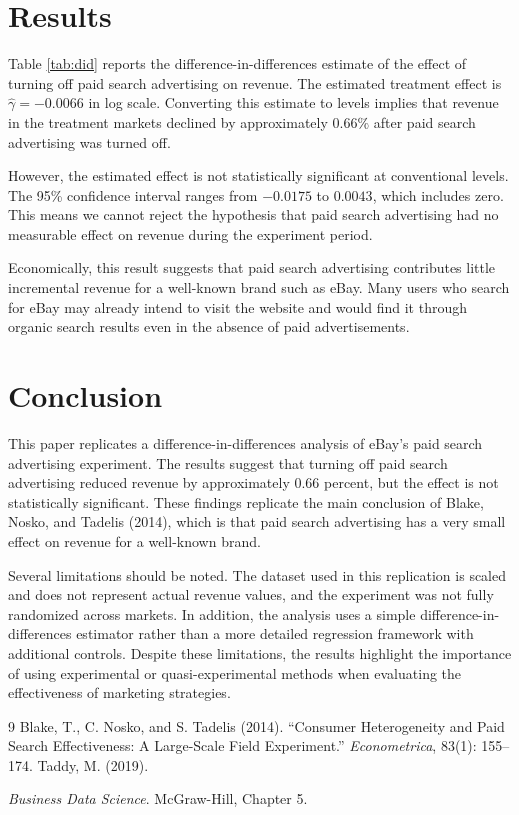 \documentclass[12pt]{article}
\begin{document}
\section{Results}


Table \ref{tab:did} reports the difference-in-differences estimate of the effect of 
turning off paid search advertising on revenue. The estimated treatment effect is 
$\hat{\gamma} = -0.0066$ in log scale. Converting this estimate to levels implies that 
revenue in the treatment markets declined by approximately $0.66\%$ after paid 
search advertising was turned off.

However, the estimated effect is not statistically significant at conventional 
levels. The 95\% confidence interval ranges from $-0.0175$ to $0.0043$, which includes 
zero. This means we cannot reject the hypothesis that paid search advertising had 
no measurable effect on revenue during the experiment period.

Economically, this result suggests that paid search advertising contributes little 
incremental revenue for a well-known brand such as eBay. Many users who search for 
eBay may already intend to visit the website and would find it through organic search 
results even in the absence of paid advertisements.

\section{Conclusion}

This paper replicates a difference-in-differences analysis of eBay's paid search 
advertising experiment. The results suggest that turning off paid search advertising 
reduced revenue by approximately 0.66 percent, but the effect is not statistically 
significant. These findings replicate the main conclusion of Blake, Nosko, and 
Tadelis (2014), which is that paid search advertising has a very small effect on 
revenue for a well-known brand.

Several limitations should be noted. The dataset used in this replication is 
scaled and does not represent actual revenue values, and the experiment was not 
fully randomized across markets. In addition, the analysis uses a simple 
difference-in-differences estimator rather than a more detailed regression 
framework with additional controls. Despite these limitations, the results highlight 
the importance of using experimental or quasi-experimental methods when 
evaluating the effectiveness of marketing strategies.

\begin{thebibliography}{9}
Blake, T., C. Nosko, and S. Tadelis (2014).
``Consumer Heterogeneity and Paid Search Effectiveness: A Large-Scale Field Experiment.''
\textit{Econometrica}, 83(1): 155--174.
Taddy, M. (2019).

\textit{Business Data Science}. McGraw-Hill, Chapter 5.
\end{thebibliography}
\end{document}
